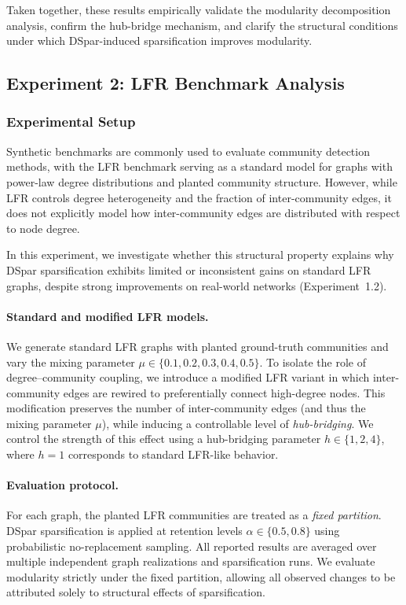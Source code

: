 \documentclass[10pt,journal,compsoc]{IEEEtran}
\begin{document}
Taken together, these results empirically validate the modularity decomposition analysis, confirm the hub-bridge mechanism, and clarify the structural conditions under which DSpar-induced sparsification improves modularity.



\subsection{Experiment 2: LFR Benchmark Analysis}
\label{sec:exp-lfr}

\subsubsection{Experimental Setup}

Synthetic benchmarks are commonly used to evaluate community detection methods, with the LFR benchmark serving as a standard model for graphs with power-law degree distributions and planted community structure.
However, while LFR controls degree heterogeneity and the fraction of inter-community edges, it does not explicitly model how inter-community edges are distributed with respect to node degree.

In this experiment, we investigate whether this structural property explains why DSpar sparsification exhibits limited or inconsistent gains on standard LFR graphs, despite strong improvements on real-world networks (Experiment~1.2).

\paragraph{Standard and modified LFR models.}
We generate standard LFR graphs with planted ground-truth communities and vary the mixing parameter $\mu \in \{0.1,0.2,0.3,0.4,0.5\}$.
To isolate the role of degree–community coupling, we introduce a modified LFR variant in which inter-community edges are rewired to preferentially connect high-degree nodes.
This modification preserves the number of inter-community edges (and thus the mixing parameter $\mu$), while inducing a controllable level of \emph{hub-bridging}.
We control the strength of this effect using a hub-bridging parameter $h \in \{1,2,4\}$, where $h=1$ corresponds to standard LFR-like behavior.

\paragraph{Evaluation protocol.}
For each graph, the planted LFR communities are treated as a \emph{fixed partition}.
DSpar sparsification is applied at retention levels $\alpha \in \{0.5,0.8\}$ using probabilistic no-replacement sampling.
All reported results are averaged over multiple independent graph realizations and sparsification runs.
We evaluate modularity strictly under the fixed partition, allowing all observed changes to be attributed solely to structural effects of sparsification.
\end{document}
